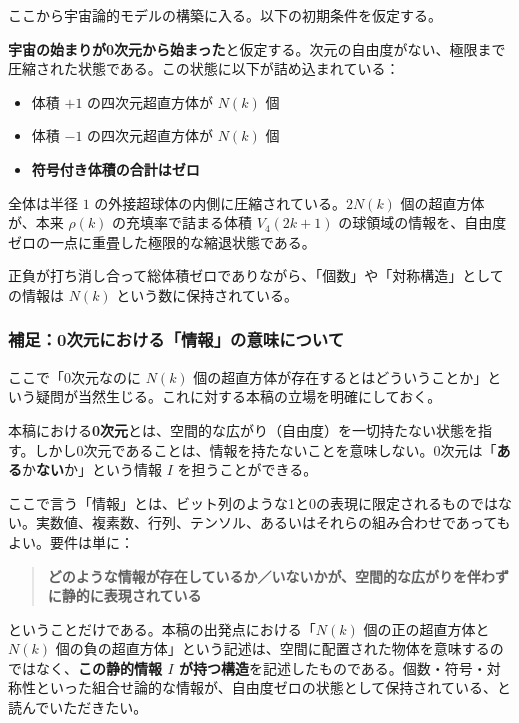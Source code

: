 \documentclass[a4paper,11pt]{ltjsarticle}
\theoremstyle{definition}
\providecommand{\tightlist}{\setlength{\itemsep}{0pt}\setlength{\parskip}{0pt}}
\begin{document}
ここから宇宙論的モデルの構築に入る。以下の初期条件を仮定する。

\textbf{宇宙の始まりが0次元から始まった}と仮定する。次元の自由度がない、極限まで圧縮された状態である。この状態に以下が詰め込まれている：

\begin{itemize}
\tightlist
\item
  体積 \(+1\) の四次元超直方体が \(N(k)\) 個
\item
  体積 \(-1\) の四次元超直方体が \(N(k)\) 個
\item
  \textbf{符号付き体積の合計はゼロ}
\end{itemize}

全体は半径 \(1\) の外接超球体の内側に圧縮されている。\(2 N(k)\)
個の超直方体が、本来 \(\rho(k)\) の充填率で詰まる体積 \(V_4(2k+1)\)
の球領域の情報を、自由度ゼロの一点に重畳した極限的な縮退状態である。

正負が打ち消し合って総体積ゼロでありながら、「個数」や「対称構造」としての情報は
\(N(k)\) という数に保持されている。

\subsubsection{補足：0次元における「情報」の意味について}\label{ux88dcux8db30ux6b21ux5143ux306bux304aux3051ux308bux60c5ux5831ux306eux610fux5473ux306bux3064ux3044ux3066}

ここで「0次元なのに \(N(k)\)
個の超直方体が存在するとはどういうことか」という疑問が当然生じる。これに対する本稿の立場を明確にしておく。

本稿における\textbf{0次元}とは、空間的な広がり（自由度）を一切持たない状態を指す。しかし0次元であることは、情報を持たないことを意味しない。0次元は「\textbf{ある}か\textbf{ない}か」という情報
\(I\) を担うことができる。

ここで言う「情報」とは、ビット列のような1と0の表現に限定されるものではない。実数値、複素数、行列、テンソル、あるいはそれらの組み合わせであってもよい。要件は単に：

\begin{quote}
\textbf{どのような情報が存在しているか／いないかが、空間的な広がりを伴わずに静的に表現されている}
\end{quote}

ということだけである。本稿の出発点における「\(N(k)\) 個の正の超直方体と
\(N(k)\)
個の負の超直方体」という記述は、空間に配置された物体を意味するのではなく、\textbf{この静的情報
\(I\)
が持つ構造}を記述したものである。個数・符号・対称性といった組合せ論的な情報が、自由度ゼロの状態として保持されている、と読んでいただきたい。
\end{document}
